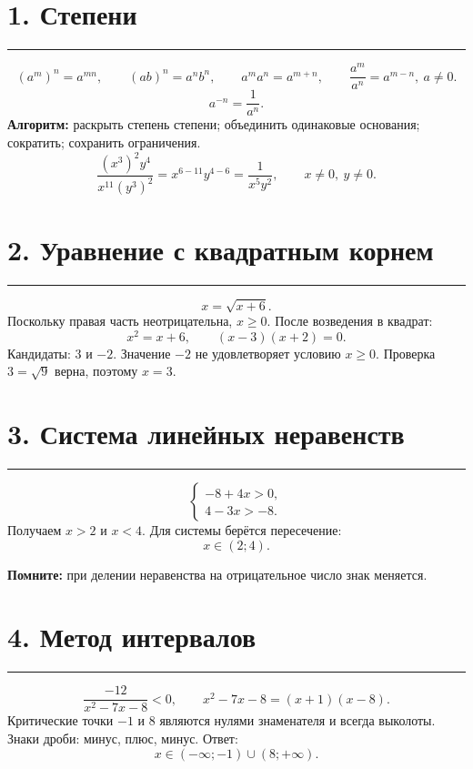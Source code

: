 \documentclass[a4paper,12pt]{article}
\newcommand{\sectionline}{\par\noindent\textcolor{accent}{\rule{\linewidth}{0.6pt}}\par}
\newcommand{\important}[1]{\textbf{\textcolor{accent}{#1}}}
\begin{document}
\section*{1. Степени}\sectionline
\[ (a^m)^n=a^{mn},\qquad (ab)^n=a^nb^n,\qquad a^ma^n=a^{m+n},\qquad \frac{a^m}{a^n}=a^{m-n},\ a\ne0. \]
\[ a^{-n}=\frac1{a^n}. \]
\important{Алгоритм:} раскрыть степень степени; объединить одинаковые основания; сократить; сохранить ограничения.
\[\frac{(x^3)^2y^4}{x^{11}(y^3)^2}=x^{6-11}y^{4-6}=\frac1{x^5y^2},\qquad x\ne0,\ y\ne0.\]
\section*{2. Уравнение с квадратным корнем}\sectionline
\[x=\sqrt{x+6}.\]
Поскольку правая часть неотрицательна, \(x\ge0\). После возведения в квадрат:
\[x^2=x+6,\qquad (x-3)(x+2)=0.\]
Кандидаты: \(3\) и \(-2\). Значение \(-2\) не удовлетворяет условию \(x\ge0\). Проверка \(3=\sqrt9\) верна, поэтому \(x=3\).
\clearpage
\section*{3. Система линейных неравенств}\sectionline
\[\begin{cases}-8+4x>0,\\4-3x>-8.\end{cases}\]
Получаем \(x>2\) и \(x<4\). Для системы берётся пересечение:
\[x\in(2;4).\]
\begin{center}\end{center}
\important{Помните:} при делении неравенства на отрицательное число знак меняется.
\section*{4. Метод интервалов}\sectionline
\[\frac{-12}{x^2-7x-8}<0,\qquad x^2-7x-8=(x+1)(x-8).\]
Критические точки \(-1\) и \(8\) являются нулями знаменателя и всегда выколоты. Знаки дроби: минус, плюс, минус. Ответ:
\[x\in(-\infty;-1)\cup(8;+\infty).\]
\begin{center}\end{center}
\clearpage
\end{document}
